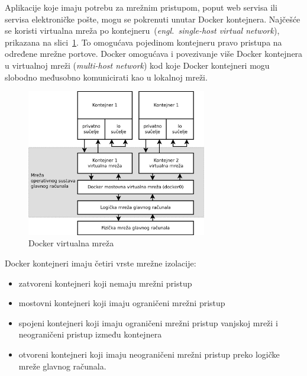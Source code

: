 Aplikacije koje imaju potrebu za mrežnim pristupom, poput web servisa ili servisa elektroničke
pošte, mogu se pokrenuti unutar Docker kontejnera. Najčešće se koristi virtualna mreža po
kontejneru~(\textit{engl.~single-host virtual network}), prikazana na
slici~\ref{fig:02docker_networking}. To omogućava pojedinom kontejneru pravo pristupa na određene
mrežne portove. Docker omogućava i povezivanje više Docker kontejnera u virtualnoj mreži
(\textit{multi-host network}) kod koje Docker kontejneri mogu slobodno međusobno komunicirati kao u
lokalnoj mreži.

\begin{figure}[h]
    \centering
    \includegraphics[width=0.7\textwidth]{img/02/docker_networking.png}
    \caption{Docker virtualna mreža}%
    \label{fig:02docker_networking}
\end{figure}

Docker kontejneri imaju četiri vrste mrežne izolacije:

\begin{itemize}
        \item zatvoreni kontejneri koji  nemaju mrežni pristup
        \item mostovni kontejneri koji imaju ograničeni mrežni pristup
        \item spojeni kontejneri koji imaju ograničeni mrežni pristup vanjskoj mreži i
            neograničeni pristup između kontejnera
        \item otvoreni kontejneri koji imaju neograničeni mrežni pristup preko logičke mreže glavnog
            računala.
\end{itemize}

